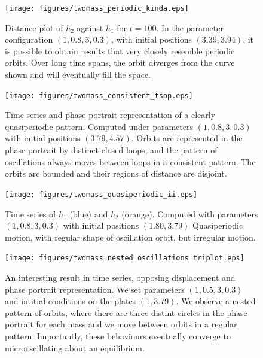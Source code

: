 \documentclass{report}
\begin{document}
\begin{figure}
    \centering
    \texttt{[image: figures/twomass\_periodic\_kinda.eps]}
    \caption{
        Distance plot of $h_2$ against $h_1$ for $t=100$.
        In the parameter configuration \((1,0.8,3,0.3)\), with initial positions $(3.39,3.94)$,
        it is possible to obtain results that very closely resemble periodic orbits.
        Over long time spans, the orbit diverges from the curve shown and will eventually fill the space.
    }
    \label{fig:twomass_semiperiodic}
\end{figure}

\begin{figure}
    \centering
    \texttt{[image: figures/twomass\_consistent\_tspp.eps]}
    \caption{
        Time series and phase portrait representation of a clearly quasiperiodic pattern.
        Computed under parameters $(1,0.8,3,0.3)$ with initial positions $(3.79,4.57)$.
        Orbits are represented in the phase portrait by distinct closed loops,
        and the pattern of oscillations always moves between loops in a consistent pattern.
        The orbits are bounded and their regions of distance are disjoint.
    }
    \label{fig:twomass_nice_orbits_tspp}
\end{figure}

\begin{figure}
    \centering
    \texttt{[image: figures/twomass\_quasiperiodic\_ii.eps]}
    \caption{
        Time series of $h_1$ (blue) and $h_2$ (orange).
        Computed with parameters $(1, 0.8, 3, 0.3)$ with initial positions $(1.80,3.79)$
        Quasiperiodic motion, with regular shape of oscillation orbit,
        but irregular motion.
    }
    \label{fig:twomass_generic_quasi}
\end{figure}

\begin{figure}
    \centering
    \texttt{[image: figures/twomass\_nested\_oscillations\_triplot.eps]}
    \caption{
        An interesting result in time series, opposing displacement and phase portrait representation.
        We set parameters \((1,0.5,3,0.3)\) and intitial conditions on the plates \((1,3.79)\).
        We observe a nested pattern of orbits,
        where there are three distint circles in the phase portrait for each mass and we move between orbits in a regular pattern.
        Importantly, these behaviours eventually converge to microoscillating about an equilibrium.
    }
    \label{fig:twomass_nested_interesting_1}
\end{figure}
\end{document}
